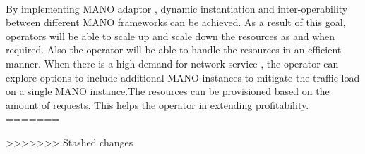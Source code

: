 \paragraph{}
By implementing MANO adaptor , dynamic instantiation and inter-operability between different MANO frameworks 
can be achieved. As a result of this goal, operators will be able to scale up and scale down the resources as and when required. Also the operator will be able to handle the resources in an efficient manner. 
When there is a high demand for network service , the operator can explore options to include additional MANO instances to mitigate the traffic load on a single MANO instance.The resources can be provisioned based on the amount of requests. This helps the operator in extending profitability. 
=======





















>>>>>>> Stashed changes

